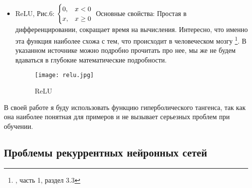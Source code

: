 \documentclass[12pt, a4paper]{article}
\begin{document}
\begin{itemize}
	\item ReLU, Рис.6:
	$
	\begin{cases}
		0, & x<0 \\
		x, & x\geq0
	\end{cases}\\
	$
	Основные свойства: Простая в дифференцировании, сокращает время на вычисления. Интересно, что именно эта функция наиболее схожа с тем, что происходит в человеческом мозгу \footnote{\cite{DeepLearning}, часть 1, раздел 3.3}. В указанном источнике можно подробно прочитать про нее, мы же не будем вдаваться в глубокие математические подробности.

	\begin{figure}[ht]
		\centering
		\texttt{[image: relu.jpg]}
		\caption{ReLU}
	\end{figure}


\end{itemize}

В своей работе я буду использовать функцию гиперболического тангенса, так как она наиболее понятная для примеров и не вызывает серьезных проблем при обучении.

\subsection{Проблемы рекуррентных нейронных сетей}
\end{document}

